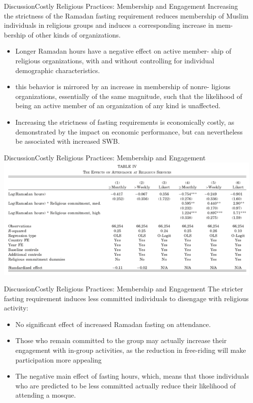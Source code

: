 \documentclass[pdftex,12pt,xcolor=pdftex,table]{beamer}
\begin{document}
    \begin{frame}{Discussion}{Costly Religious Practices: Membership and Engagement}
    Increasing the strictness of the Ramadan fasting requirement reduces membership of Muslim individuals in religious groups and induces a corresponding increase in mem- bership of other kinds of organizations.
    \begin{itemize}
        \item<2-> Longer Ramadan hours have a negative effect on active member- ship of religious organizations, with and without controlling for individual demographic characteristics.
        \item<3-> this behavior is mirrored by an increase in membership of nonre- ligious organizations, essentially of the same magnitude, such that the likelihood of being an active member of an organization of any kind is unaffected. 
        \item<4-> Increasing the strictness of fasting requirements is economically costly, as demonstrated by the impact on economic performance, but can nevertheless be associated with increased SWB.
      \end{itemize}
    \end{frame}


    \begin{frame}{Discussion}{Costly Religious Practices: Membership and Engagement}
    \vspace{-0.5cm}
    \centering\includegraphics[scale=0.37]{tab4.png}

    \end{frame}
    

    \begin{frame}{Discussion}{Costly Religious Practices: Membership and Engagement}
    The stricter fasting requirement induces less committed individuals to disengage with religious activity: 
    \begin{itemize}
        \item<2-> No significant effect of increased Ramadan fasting on attendance.
        \item<3-> Those who remain committed to the group may actually increase their engagement with in-group activities, as the reduction in free-riding will make participation more appealing 
        \item<4-> The negative main effect of fasting hours, which,  means that those individuals who are predicted to be less committed actually reduce their likelihood of attending a mosque.
        
      \end{itemize}
    \end{frame}
    
\end{document}
